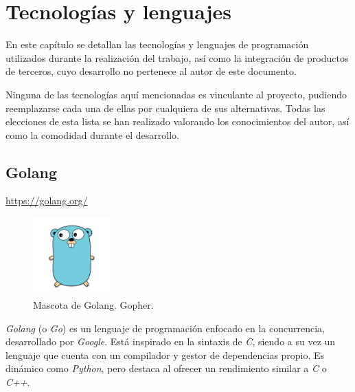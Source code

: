 

\chapter{Tecnologías y lenguajes} \label{cap:tech}

En este capítulo se detallan las tecnologías y lenguajes de programación utilizados durante la realización del trabajo, así como la integración de productos de terceros, cuyo desarrollo no pertenece al autor de este documento.\sn

Ninguna de las tecnologías aquí mencionadas es vinculante al proyecto, pudiendo reemplazarse cada una de ellas por cualquiera de sus alternativas. Todas las elecciones de esta lista se han realizado valorando los conocimientos del autor, así como la comodidad durante el desarrollo.\n


\section{Golang} \label{sec:golang}

\footnotesize\color{gray}
\url{https://golang.org/}
\normalsize\color{black}\sn

\begin{figure}
\includegraphics[width=3cm]{img/tables/11_Golang.png}
\caption{Mascota de Golang. Gopher.}
\label{fig:golang}
\end{figure}

\textit{Golang} (o \textit{Go}) es un lenguaje de programación enfocado en la concurrencia, desarrollado por \textit{Google}. Está inspirado en la sintaxis de \textit{C}, siendo a su vez un lenguaje que cuenta con un compilador y gestor de dependencias propio. Es dinámico como \textit{Python}, pero destaca al ofrecer un rendimiento similar a \textit{C} o \textit{C++}.\sn

